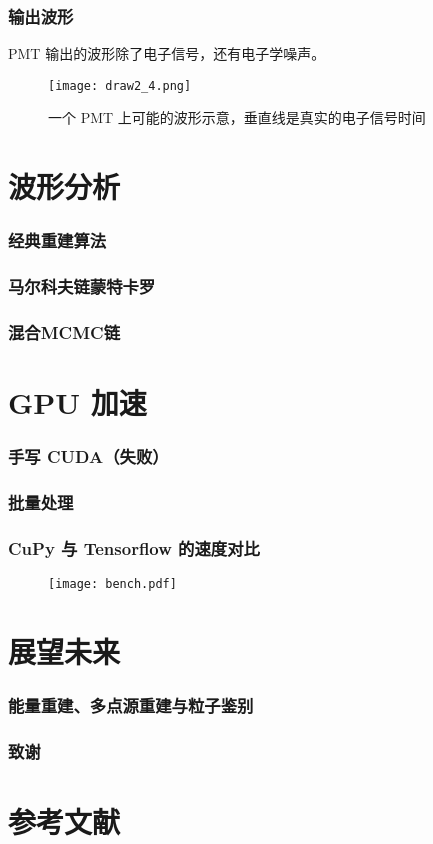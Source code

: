 \documentclass[aspectratio=149]{beamer}
\begin{document}
\begin{frame}
    \frametitle{输出波形}

    PMT 输出的波形除了电子信号，还有电子学噪声。

    \begin{figure}
        \centering
        \texttt{[image: draw2\_4.png]}
        \caption{一个 PMT 上可能的波形示意，垂直线是真实的电子信号时间}
    \end{figure}

\end{frame}
\section{波形分析}
\begin{frame}
    \frametitle{经典重建算法}



\end{frame}

\begin{frame}
    \frametitle{马尔科夫链蒙特卡罗}



\end{frame}

\begin{frame}
    \frametitle{混合MCMC链}



\end{frame}
\section{GPU 加速}
\begin{frame}
    \frametitle{手写 CUDA（失败）}



\end{frame}

\begin{frame}
    \frametitle{批量处理}



\end{frame}

\begin{frame}
    \frametitle{CuPy 与 Tensorflow 的速度对比}

    \begin{figure}
        \centering
        \texttt{[image: bench.pdf]}
    \end{figure}

\end{frame}
\section{展望未来}
\begin{frame}
    \frametitle{能量重建、多点源重建与粒子鉴别}



\end{frame}

\begin{frame}
    \frametitle{致谢}



\end{frame}
\section{参考文献}
\end{document}
